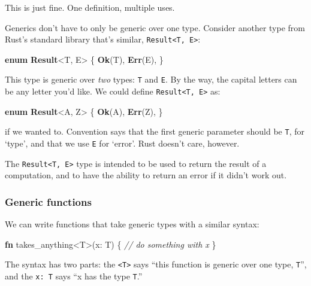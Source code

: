 \documentclass[a4paper,]{book}
\newenvironment{Shaded}{\begin{snugshade}}{\end{snugshade}}
\newcommand{\KeywordTok}[1]{\textcolor[rgb]{0.13,0.29,0.53}{\textbf{{#1}}}}
\newcommand{\CommentTok}[1]{\textcolor[rgb]{0.56,0.35,0.01}{\textit{{#1}}}}
\newcommand{\NormalTok}[1]{{#1}}
\begin{document}
This is just fine. One definition, multiple uses.

Generics don't have to only be generic over one type. Consider another
type from Rust's standard library that's similar,
\texttt{Result\textless{}T,\ E\textgreater{}}:

\begin{Shaded}
\begin{Highlighting}[]
\KeywordTok{enum} \KeywordTok{Result}\NormalTok{<T, E> \{}
    \KeywordTok{Ok}\NormalTok{(T),}
    \KeywordTok{Err}\NormalTok{(E),}
\NormalTok{\}}
\end{Highlighting}
\end{Shaded}

This type is generic over \emph{two} types: \texttt{T} and \texttt{E}.
By the way, the capital letters can be any letter you'd like. We could
define \texttt{Result\textless{}T,\ E\textgreater{}} as:

\begin{Shaded}
\begin{Highlighting}[]
\KeywordTok{enum} \KeywordTok{Result}\NormalTok{<A, Z> \{}
    \KeywordTok{Ok}\NormalTok{(A),}
    \KeywordTok{Err}\NormalTok{(Z),}
\NormalTok{\}}
\end{Highlighting}
\end{Shaded}

if we wanted to. Convention says that the first generic parameter should
be \texttt{T}, for `type', and that we use \texttt{E} for `error'. Rust
doesn't care, however.

The \texttt{Result\textless{}T,\ E\textgreater{}} type is intended to be
used to return the result of a computation, and to have the ability to
return an error if it didn't work out.

\subsubsection{Generic functions}\label{generic-functions}

We can write functions that take generic types with a similar syntax:

\begin{Shaded}
\begin{Highlighting}[]
\KeywordTok{fn} \NormalTok{takes_anything<T>(x: T) \{}
    \CommentTok{// do something with x}
\NormalTok{\}}
\end{Highlighting}
\end{Shaded}

The syntax has two parts: the \texttt{\textless{}T\textgreater{}} says
``this function is generic over one type, \texttt{T}'', and the
\texttt{x:\ T} says ``x has the type \texttt{T}.''
\end{document}
